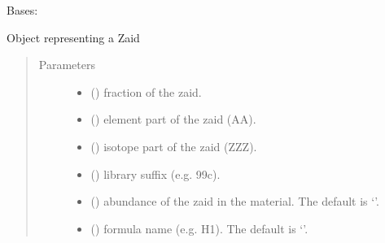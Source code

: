 \documentclass[letterpaper,10pt,english]{sphinxmanual}
\begin{document}
\begin{fulllineitems}
\label{\detokenize{api/inputgeneration:matreader.Zaid}}
\sphinxAtStartPar
Bases: 

\sphinxAtStartPar
Object representing a Zaid
\begin{quote}\begin{description}
\item[{Parameters}] \leavevmode\begin{itemize}
\item {} 
\sphinxAtStartPar
{} () \textendash{} fraction of the zaid.

\item {} 
\sphinxAtStartPar
{} () \textendash{} element part of the zaid (AA).

\item {} 
\sphinxAtStartPar
{} () \textendash{} isotope part of the zaid (ZZZ).

\item {} 
\sphinxAtStartPar
{} () \textendash{} library suffix (e.g. 99c).

\item {} 
\sphinxAtStartPar
{} (\sphinxstyleliteralemphasis{\sphinxupquote{, }}) \textendash{} abundance of the zaid in the material. The default is ‘’.

\item {} 
\sphinxAtStartPar
{} (\sphinxstyleliteralemphasis{\sphinxupquote{, }}) \textendash{} formula name (e.g. H1). The default is ‘’.


\end{itemize}
\end{description}
\end{quote}
\end{fulllineitems}
\end{document}
